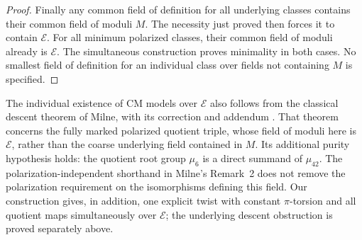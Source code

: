 \begin{proof}
Finally any common field of definition for all underlying classes
contains their common field of moduli $M$. The necessity just proved
then forces it to contain $\mathcal E$. For all minimum polarized
classes, their common field of moduli already is $\mathcal E$.
The simultaneous construction proves minimality in both cases.
No smallest field of definition for an individual class over fields
not containing $M$ is specified.
\end{proof}

The individual existence of CM models over $\mathcal E$ also follows
from the classical descent theorem of Milne, with its correction and
addendum \cite{MilneModuli1972,MilneModuli1974}.
That theorem concerns the fully marked polarized quotient triple,
whose field of moduli here is $\mathcal E$, rather than the coarse
underlying field contained in $M$. Its additional purity hypothesis
holds: the quotient root group $\mu_6$ is a direct summand of
$\mu_{42}$. The polarization-independent shorthand in Milne's
Remark~2 does not remove the polarization requirement on the
isomorphisms defining this field. Our construction gives, in addition,
one explicit twist with constant $\pi$-torsion and all quotient maps
simultaneously over $\mathcal E$; the underlying descent obstruction
is proved separately above.

